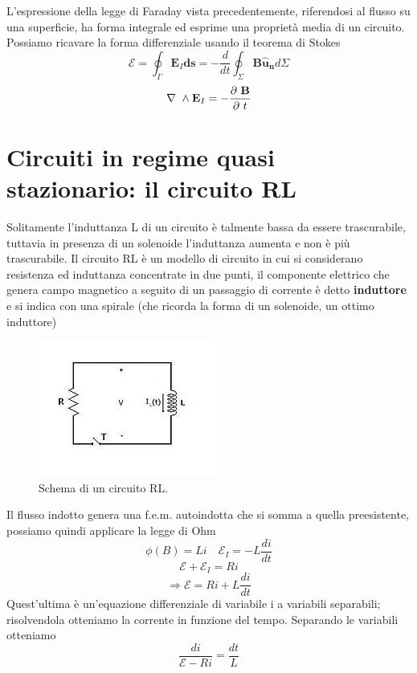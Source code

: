 \documentclass[
10pt, %
a4paper, %
oneside, %
headinclude,footinclude, %
BCOR5mm, %
]{scrartcl}
\begin{document}
L'espressione della legge di Faraday vista precedentemente, riferendosi al flusso su una superficie, ha forma integrale ed esprime una proprietà media di un circuito. Possiamo ricavare la forma differenziale usando il teorema di Stokes
\[\mathcal{E} = \oint_{\Gamma}\mathbf{E}_I \mathbf{ds} = -\frac{d}{dt}\oint_{\Sigma}\mathbf{B\mathbf{\hat{u}_n}}d\Sigma\]
\begin{align}\label{eq:Faraday_differenziale}
	\nabla\ \wedge\mathbf{E}_I = -\frac{\partial\  \mathbf{B}}{\partial\  t}
\end{align}
\section{Circuiti in regime quasi stazionario: il circuito RL}
Solitamente l'induttanza L di un circuito è talmente bassa da essere trascurabile, tuttavia in presenza di un solenoide l'induttanza aumenta e non è più trascurabile. Il circuito RL è un modello di circuito in cui si considerano resistenza ed induttanza concentrate in due punti, il componente elettrico che genera campo magnetico a seguito di un passaggio di corrente è detto \textbf{induttore} e si indica con una spirale (che ricorda la forma di un solenoide, un ottimo induttore)
\begin{figure}[h!]
	\centering
	\includegraphics[width=0.6\linewidth]{../images/circuito_RL}
	\caption{Schema di un circuito RL.}
	\label{fig:circuitorl}
\end{figure}
\FloatBarrier
Il flusso indotto genera una f.e.m. autoindotta che si somma a quella preesistente, possiamo quindi applicare la legge di Ohm 
\[\phi(B) = L i \quad \mathcal{E}_I = -L\frac{d i}{dt}\]
\[\mathcal{E} + \mathcal{E}_I = Ri \]
\[\Rightarrow \mathcal{E} = Ri+L\frac{di}{dt}\]
Quest'ultima è un'equazione differenziale di variabile i a variabili separabili; risolvendola otteniamo la corrente in funzione del tempo. Separando le variabili otteniamo
\[\frac{di}{\mathcal{E}-Ri} = \frac{dt}{L}\]
\end{document}
